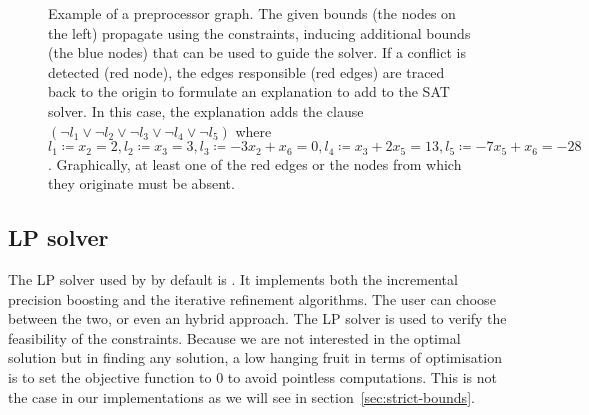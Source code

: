 \documentclass[runningheads]{llncs}
\begin{document}
\begin{figure}[h]
    \caption{Example of a preprocessor graph. The given bounds (the nodes on the left) propagate using the constraints, inducing additional bounds (the blue nodes) that can be used to guide the solver.
        If a conflict is detected (red node), the edges responsible (red edges) are traced back to the origin to formulate an explanation to add to the SAT solver.
        In this case, the explanation adds the clause $(\neg l_1 \lor \neg l_2 \lor \neg l_3 \lor \neg l_4 \lor \neg l_5)$ where $l_1 \coloneqq x_2 = 2, l_2 \coloneqq x_3 = 3, l_3 \coloneqq -3x_2 + x_6 = 0, l_4 \coloneqq x_3 + 2x_5 = 13, l_5 \coloneqq -7x_5 + x_6 = -28$.
        Graphically, at least one of the red edges or the nodes from which they originate must be absent.}
         \label{dg:preprocessor}
\end{figure}

\subsection{LP solver}

The LP solver used by \dlinear by default is \soplex.
It implements both the incremental precision boosting and the iterative refinement algorithms.
The user can choose between the two, or even an hybrid approach.
The LP solver is used to verify the feasibility of the constraints.
Because we are not interested in the optimal solution but in finding any solution, a low hanging fruit in terms of optimisation is to set the objective function to $0$ to avoid pointless computations.
This is not the case in our implementations as we will see in section~\ref{sec:strict-bounds}.
\end{document}
